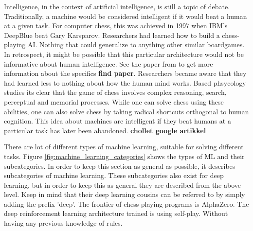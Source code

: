 \documentclass{article}
\begin{document}
Intelligence, in the context of artificial intelligence, is still a topic of debate. Traditionally, a machine would be considered intelligent if it would beat a human at a given task. For computer chess, this was achieved in 1997 when IBM's DeepBlue beat Gary Karsparov. Researchers had learned how to build a chess-playing AI. Nothing that could generalize to anything other similar boardgames. In retrospect, it might be possible that this particular architecture would not be informative about human intelligence. See the paper from to get more information about the specifics \textbf{find paper}. Researchers became aware that they had learned less to nothing about how the human mind works. Based phsycology studies its clear that the game of chess involves complex reasoning, search, perceptual and memorial processes. While one can solve chess using these abilities, one can also solve chess by taking radical shortcuts orthogonal to human cognition. This idea about machines are intelligent if they beat humans at a particular task has later been abandoned. \textbf{chollet google artikkel}

There are lot of different types of machine learning, suitable for solving different tasks. Figure \ref{fig:machine_learning_categories} shows the types of ML and their subcategories. In order to keep this section as general as possible, it describes subcategories of machine learning. These subcategories also exist for deep learning, but in order to keep this as general they are described from the above level. Keep in mind that their deep learning cousins can be referred to by simply adding the prefix 'deep'. The frontier of chess playing programs is AlphaZero. The deep reinforcement learning architecture trained is using self-play. Without having any previous knowledge of rules. 
 
\end{document}
